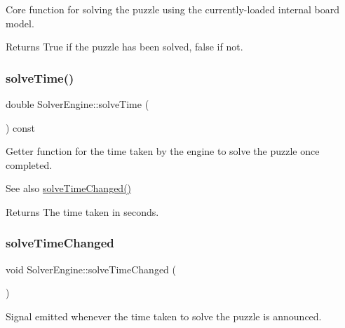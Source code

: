 Core function for solving the puzzle using the currently-\/loaded internal board model. 

\begin{DoxyReturn}{Returns}
True if the puzzle has been solved, false if not. 
\end{DoxyReturn}
\mbox{\label{class_solver_engine_af647e59feb82e7a8aa445e1e03a386aa}} 
\subsubsection{\texorpdfstring{solve\+Time()}{solveTime()}}
{\footnotesize\ttfamily double Solver\+Engine\+::solve\+Time (\begin{DoxyParamCaption}{ }\end{DoxyParamCaption}) const\hspace{0.3cm}{\ttfamily [inline]}}



Getter function for the time taken by the engine to solve the puzzle once completed. 

\begin{DoxySeeAlso}{See also}
\mbox{\hyperlink{class_solver_engine_a66c3ab757c4e8aa50484f992f2b1ba7e}{solve\+Time\+Changed()}} 
\end{DoxySeeAlso}
\begin{DoxyReturn}{Returns}
The time taken in seconds. 
\end{DoxyReturn}
\mbox{\label{class_solver_engine_a66c3ab757c4e8aa50484f992f2b1ba7e}} 
\subsubsection{\texorpdfstring{solve\+Time\+Changed}{solveTimeChanged}}
{\footnotesize\ttfamily void Solver\+Engine\+::solve\+Time\+Changed (\begin{DoxyParamCaption}{ }\end{DoxyParamCaption})\hspace{0.3cm}{\ttfamily [signal]}}



Signal emitted whenever the time taken to solve the puzzle is announced. 

